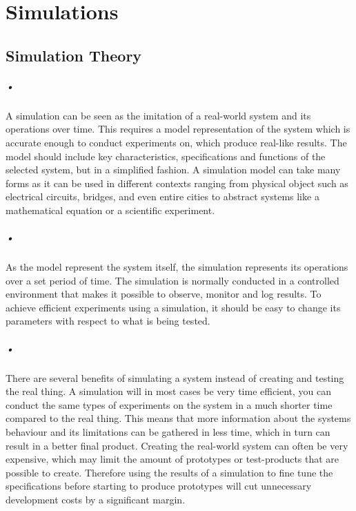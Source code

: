 \documentclass[a4paper, 12pt]{report}
\begin{document}
\chapter{Simulations}
\label{cha:3}

\section{Simulation Theory}

\paragraph{•}
A simulation can be seen as the imitation of a real-world system and its operations over time.
This requires a model representation of the system which is accurate enough to conduct experiments on, which produce real-like results.
The model should include key characteristics, specifications and functions of the selected system, but in a simplified fashion.
A simulation model can take many forms as it can be used in different contexts ranging from physical object such as electrical circuits, bridges, and even entire cities to abstract systems like a mathematical equation or a scientific experiment\cite{simulations}.

\paragraph{•}
As the model represent the system itself, the simulation represents its operations over a set period of time.
The simulation is normally conducted in a controlled environment that makes it possible to observe, monitor and log results.
To achieve efficient experiments using a simulation, it should be easy to change its parameters with respect to what is being tested.

\paragraph{•}
There are several benefits of simulating a system instead of creating and testing the real thing.
A simulation will in most cases be very time efficient, you can conduct the same types of experiments on the system in a much shorter time compared to the real thing.
This means that more information about the systems behaviour and its limitations can be gathered in less time, which in turn can result in a better final product.
Creating the real-world system can often be very expensive, which may limit the amount of prototypes or test-products that are possible to create.
Therefore using the results of a simulation to fine tune the specifications before starting to produce prototypes will cut unnecessary development costs by a significant margin.
\end{document}
